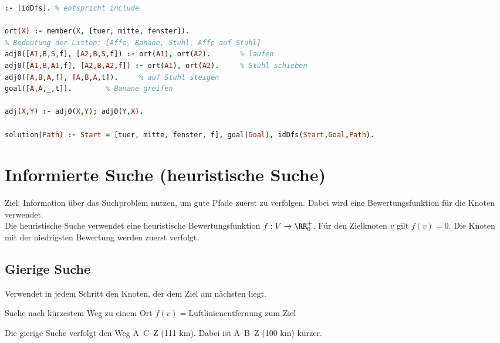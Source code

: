 \begin{lstlisting}[language=Prolog]
:- [idDfs].	% entspricht include

ort(X) :- member(X, [tuer, mitte, fenster]).
% Bedeutung der Listen: [Affe, Banane, Stuhl, Affe auf Stuhl]
adj0([A1,B,S,f], [A2,B,S,f]) :- ort(A1), ort(A2).		% laufen
adj0([A1,B,A1,f], [A2,B,A2,f]) :- ort(A1), ort(A2).		% Stuhl schieben
adj0([A,B,A,f], [A,B,A,t]).		% auf Stuhl steigen
goal([A,A,_,t]).		% Banane greifen

adj(X,Y) :- adj0(X,Y); adj0(Y,X).

solution(Path) :- Start = [tuer, mitte, fenster, f], goal(Goal), idDfs(Start,Goal,Path).
\end{lstlisting}

\section{Informierte Suche (heuristische Suche)}
Ziel: Information über das Suchproblem nutzen, um gute Pfade zuerst zu verfolgen. Dabei wird eine Bewertungsfunktion für die Knoten verwendet.\\
Die heuristische Suche verwendet eine heuristische Bewertungsfunktion $f: V\to \RR_0^+$. Für den Zielknoten $v$ gilt $f(v)=0$. Die Knoten mit der niedrigsten Bewertung werden zuerst verfolgt.
\subsection{Gierige Suche} Verwendet in jedem Schritt den Knoten, der dem Ziel am nächsten liegt.

 Suche nach kürzestem Weg zu einem Ort $f(v)=\text{Luftlinienentfernung zum Ziel}$
\begin{center}
\end{center}
Die gierige Suche verfolgt den Weg A--C--Z (111 km). Dabei ist A--B--Z (100 km) kürzer.

